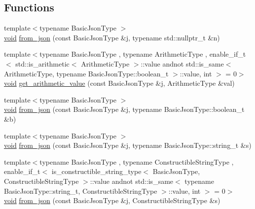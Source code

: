\subsection*{Functions}
\begin{DoxyCompactItemize}
\item 
{\footnotesize template$<$typename Basic\+Json\+Type $>$ }\\\hyperlink{namespacenlohmann_1_1detail_a59fca69799f6b9e366710cb9043aa77d}{void} \hyperlink{namespacenlohmann_1_1detail_a1f0395aad0fe853a4539288749d3a603}{from\+\_\+json} (const Basic\+Json\+Type \&j, typename std\+::nullptr\+\_\+t \&n)
\item 
{\footnotesize template$<$typename Basic\+Json\+Type , typename Arithmetic\+Type , enable\+\_\+if\+\_\+t$<$ std\+::is\+\_\+arithmetic$<$ Arithmetic\+Type $>$\+::value andnot std\+::is\+\_\+same$<$ Arithmetic\+Type, typename Basic\+Json\+Type\+::boolean\+\_\+t $>$\+::value, int $>$  = 0$>$ }\\\hyperlink{namespacenlohmann_1_1detail_a59fca69799f6b9e366710cb9043aa77d}{void} \hyperlink{namespacenlohmann_1_1detail_a85955b9c6dd31846e4b8e891f78614b6}{get\+\_\+arithmetic\+\_\+value} (const Basic\+Json\+Type \&j, Arithmetic\+Type \&val)
\item 
{\footnotesize template$<$typename Basic\+Json\+Type $>$ }\\\hyperlink{namespacenlohmann_1_1detail_a59fca69799f6b9e366710cb9043aa77d}{void} \hyperlink{namespacenlohmann_1_1detail_a58117f225f43d03e3a0a4a6f3d77c9d9}{from\+\_\+json} (const Basic\+Json\+Type \&j, typename Basic\+Json\+Type\+::boolean\+\_\+t \&b)
\item 
{\footnotesize template$<$typename Basic\+Json\+Type $>$ }\\\hyperlink{namespacenlohmann_1_1detail_a59fca69799f6b9e366710cb9043aa77d}{void} \hyperlink{namespacenlohmann_1_1detail_ad74d89f77ada7a57eff38b43d4bf2335}{from\+\_\+json} (const Basic\+Json\+Type \&j, typename Basic\+Json\+Type\+::string\+\_\+t \&s)
\item 
{\footnotesize template$<$typename Basic\+Json\+Type , typename Constructible\+String\+Type , enable\+\_\+if\+\_\+t$<$ is\+\_\+constructible\+\_\+string\+\_\+type$<$ Basic\+Json\+Type, Constructible\+String\+Type $>$\+::value andnot std\+::is\+\_\+same$<$ typename Basic\+Json\+Type\+::string\+\_\+t, Constructible\+String\+Type $>$\+::value, int $>$  = 0$>$ }\\\hyperlink{namespacenlohmann_1_1detail_a59fca69799f6b9e366710cb9043aa77d}{void} \hyperlink{namespacenlohmann_1_1detail_a2932f2bc2943dac6d51669312f4fc0f5}{from\+\_\+json} (const Basic\+Json\+Type \&j, Constructible\+String\+Type \&s)

\end{DoxyCompactItemize}
